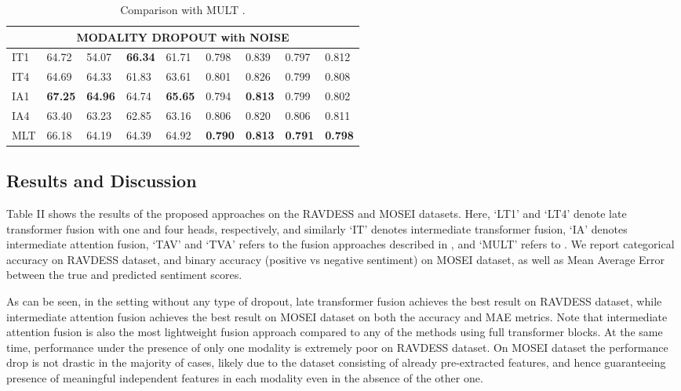 \documentclass[a4paper,conference]{IEEEtran}
\begin{document}
\begin{table}[]
\begin{tabular}{|l|p{13pt}p{13pt}p{13pt}p{13pt}|p{13pt}p{13pt}p{13pt}p{13pt}|}
\hline
\multicolumn{9}{c}{MODALITY DROPOUT with NOISE}                                                                                                     \\
\hline
IT1  & 64.72          & 54.07          & \textbf{66.34} & 61.71          & 0.798          & 0.839          & 0.797          & 0.812          \\
IT4  & 64.69          & 64.33          & 61.83          & 63.61          & 0.801          & 0.826          & 0.799          & 0.808          \\
IA1  & \textbf{67.25} & \textbf{64.96} & 64.74          & \textbf{65.65} & 0.794         & \textbf{0.813} & 0.799          & 0.802          \\
IA4  & 63.40          & 63.23          & 62.85          & 63.16          & 0.806 & 0.820          & 0.806          & 0.811          \\
MLT   & 66.18          & 64.19          & 64.39          & 64.92          & \textbf{0.790}          & \textbf{0.813} & \textbf{0.791} & \textbf{0.798} \\ \hline 
\end{tabular}
\caption{Comparison with MULT \cite{mult}.}
\end{table}


\subsection{Results and Discussion}

Table II shows the results of the proposed approaches on the RAVDESS and MOSEI datasets. Here, `LT1' and `LT4' denote late transformer fusion with one and four heads, respectively, and similarly `IT' denotes intermediate transformer fusion, `IA' denotes intermediate attention fusion, `TAV' and `TVA' refers to the fusion approaches described in \cite{icasspav}, and `MULT' refers to \cite{mult}. We report categorical accuracy on RAVDESS dataset, and binary accuracy (positive vs negative sentiment) on MOSEI dataset, as well as Mean Average Error between the true and predicted sentiment scores. 

As can be seen, in the setting without any type of dropout, late transformer fusion achieves the best result on RAVDESS dataset, while intermediate attention fusion achieves the best result on MOSEI dataset on both the accuracy and MAE metrics. Note that intermediate attention fusion is also the most lightweight fusion approach compared to any of the methods using full transformer blocks. At the same time, performance under the presence of only one modality is extremely poor on RAVDESS dataset. On MOSEI dataset the performance drop is not drastic in the majority of cases, likely due to the dataset consisting of already pre-extracted features, and hence guaranteeing presence of meaningful independent features in each modality even in the absence of the other one. 
\end{document}
